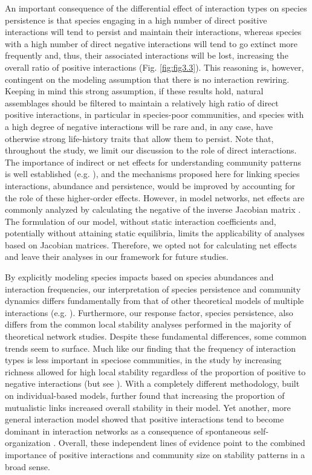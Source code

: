 An important consequence of the differential effect of interaction types on species persistence is that species engaging in a high number of direct positive interactions will tend to persist and maintain their interactions, whereas species with a high number of direct negative interactions will tend to go extinct more frequently and, thus, their associated interactions will be lost, increasing the overall ratio of positive interactions (Fig. \ref{fig:fig3.3}). This reasoning is, however, contingent on the modeling assumption that there is no interaction rewiring. Keeping in mind this strong assumption, if these results hold, natural assemblages should be filtered to maintain a relatively high ratio of direct positive interactions, in particular in species-poor communities, and species with a high degree of negative interactions will be rare and, in any case, have otherwise strong life-history traits that allow them to persist. Note that, throughout the study, we limit our discussion to the role of direct interactions. The importance of indirect or net effects for understanding community patterns is well established (e.g. \citealt{Montoya2009a}), and the mechanisms proposed here for linking species interactions, abundance and persistence, would be improved by accounting for the role of these higher-order effects. However, in model networks, net effects are commonly analyzed by calculating the negative of the inverse Jacobian matrix \citep{Novak2016}. The formulation of our model, without static interaction coefficients and, potentially without attaining static equilibria, limits the applicability of analyses based on Jacobian matrices. Therefore, we opted not for calculating net effects and leave their analyses in our framework for future studies.

By explicitly modeling species impacts based on species abundances and interaction frequencies, our interpretation of species persistence and community dynamics differs fundamentally from that of other theoretical models of multiple interactions (e.g. \citealt{Mougi2012}). Furthermore, our response factor, species persistence, also differs from the common local stability analyses performed in the majority of theoretical network studies. Despite these fundamental differences, some common trends seem to surface. Much like our finding that the frequency of interaction types is less important in speciose communities, in the study by \cite{Mougi2012} increasing richness allowed for high local stability regardless of the proportion of positive to negative interactions (but see \citealt{Suweis2014}). With a completely different methodology, built on individual-based models, \cite{Lurgi2016} further found that increasing the proportion of mutualistic links increased overall stability in their model. Yet another, more general interaction model showed that positive interactions tend to become dominant in interaction networks as a consequence of spontaneous self-organization \citep{Jain2001}. Overall, these independent lines of evidence point to the combined importance of positive interactions and community size on stability patterns in a broad sense.

